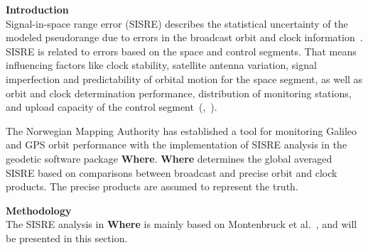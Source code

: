 {\large\bfseries Introduction}\\
Signal-in-space range error (SISRE) describes the statistical uncertainty of the modeled pseudorange due to errors in the broadcast orbit and clock information~\cite{montenbruck2015b}. SISRE is related to errors based on the space and control segments. That means influencing factors like clock stability, satellite antenna variation, signal imperfection and predictability of orbital motion for the space segment, as well as orbit and clock determination performance, distribution of monitoring stations, and upload capacity of the control segment~(\cite{heng2012},~\cite{montenbruck2015b}).

The Norwegian Mapping Authority has established a tool for monitoring Galileo and GPS orbit performance with the implementation of SISRE analysis in the geodetic software package \textbf{Where}. \textbf{Where} determines the global 
averaged SISRE based on comparisons between broadcast and precise orbit and clock products. The precise products are assumed to represent the truth.




{\large\bfseries Methodology}\\
The SISRE analysis in \textbf{Where} is mainly based on Montenbruck et al.~\cite{montenbruck2018}, and will be presented in this section. 


